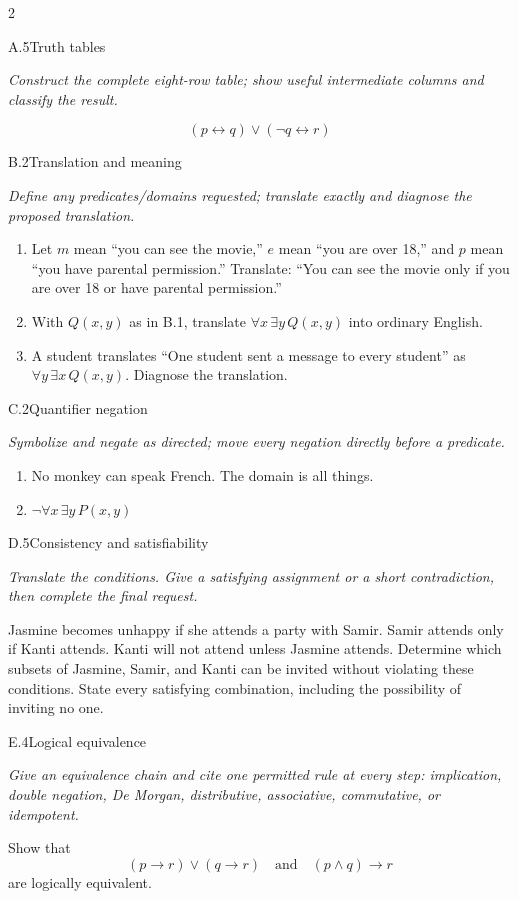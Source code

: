 \documentclass[9pt]{extarticle}
\begin{document}
\begin{multicols}{2}
\begin{CoreProblem}{A.5}{Truth tables}
{\scriptsize\textit{Construct the complete eight-row table; show useful intermediate columns and classify the result.}\par}
\[
  (p\leftrightarrow q)\lor(\neg q\leftrightarrow r)
\]
\end{CoreProblem}
\begin{CoreProblem}{B.2}{Translation and meaning}
{\scriptsize\textit{Define any predicates/domains requested; translate exactly and diagnose the proposed translation.}\par}
\begin{enumerate}[label=(\alph*)]
  \item Let $m$ mean ``you can see the movie,'' $e$ mean ``you are over 18,''
        and $p$ mean ``you have parental permission.'' Translate: ``You can
        see the movie only if you are over 18 or have parental permission.''
  \item With $Q(x,y)$ as in B.1, translate $\forall x\,\exists y\,Q(x,y)$
        into ordinary English.
  \item A student translates ``One student sent a message to every student''
        as $\forall y\,\exists x\,Q(x,y)$. Diagnose the translation.
\end{enumerate}
\end{CoreProblem}
\begin{CoreProblem}{C.2}{Quantifier negation}
{\scriptsize\textit{Symbolize and negate as directed; move every negation directly before a predicate.}\par}
\begin{enumerate}[label=(\alph*)]
  \item No monkey can speak French. The domain is all things.
  \item $\neg\forall x\,\exists y\,P(x,y)$
\end{enumerate}
\end{CoreProblem}
\columnbreak
\begin{CoreProblem}{D.5}{Consistency and satisfiability}
{\scriptsize\textit{Translate the conditions. Give a satisfying assignment or a short contradiction, then complete the final request.}\par}
Jasmine becomes unhappy if she attends a party with Samir. Samir attends only
if Kanti attends. Kanti will not attend unless Jasmine attends. Determine which
subsets of Jasmine, Samir, and Kanti can be invited without violating these
conditions. State every satisfying combination, including the possibility of
inviting no one.
\end{CoreProblem}
\begin{CoreProblem}{E.4}{Logical equivalence}
{\scriptsize\textit{Give an equivalence chain and cite one permitted rule at every step: implication, double negation, De Morgan, distributive, associative, commutative, or idempotent.}\par}
Show that
\[
  (p\to r)\lor(q\to r)
  \quad\text{and}\quad
  (p\land q)\to r
\]
are logically equivalent.
\end{CoreProblem}
\end{multicols}
\end{document}

